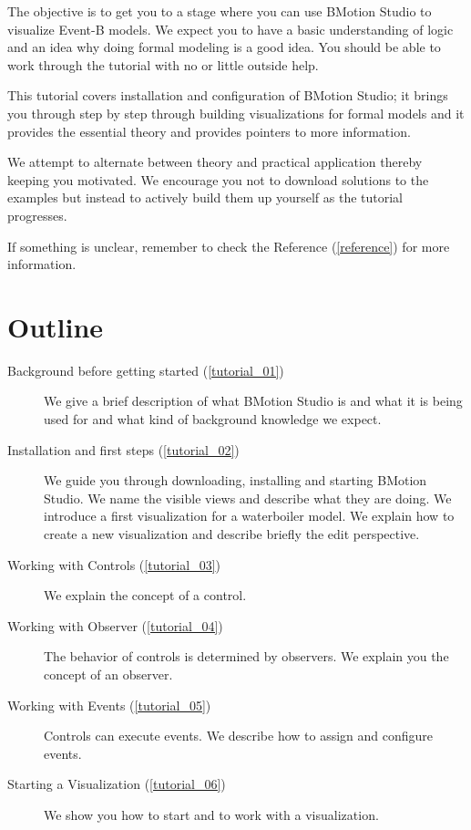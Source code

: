 
The objective is to get you to a stage where you can use BMotion Studio to visualize Event-B models.  We expect you to have a basic understanding of logic and an idea why doing formal modeling is a good idea.  You should be able to work through the tutorial with no or little outside help.

This tutorial covers installation and configuration of BMotion Studio; it brings you through step by step through building visualizations for formal models and it provides the essential theory and provides pointers to more information.

We attempt to alternate between theory and practical application thereby keeping you motivated.  We encourage you not to download solutions to the examples but instead to actively build them up yourself as the tutorial progresses.

If something is unclear, remember to check the Reference (\ref{reference}) for more information.

\section{Outline}

\begin{description}
	\item[Background before getting started (\ref{tutorial_01})] We give a brief description of what BMotion Studio is and what it is being used for and what kind of background knowledge we expect.
	\item[Installation and first steps (\ref{tutorial_02})] We guide you through downloading, installing and starting BMotion Studio. We name the visible views and describe what they are doing. We introduce a first visualization for a waterboiler model. We explain how to create a new visualization and describe briefly the edit perspective.
	\item[Working with Controls (\ref{tutorial_03})] We explain the concept of a control.
	\item[Working with Observer (\ref{tutorial_04})] The behavior of controls is determined by observers. We explain you the concept of an observer.
	\item[Working with Events (\ref{tutorial_05})] Controls can execute events. We describe how to assign and configure events.
	\item[Starting a Visualization (\ref{tutorial_06})] We show you how to start and to work with a visualization.
\end{description}

